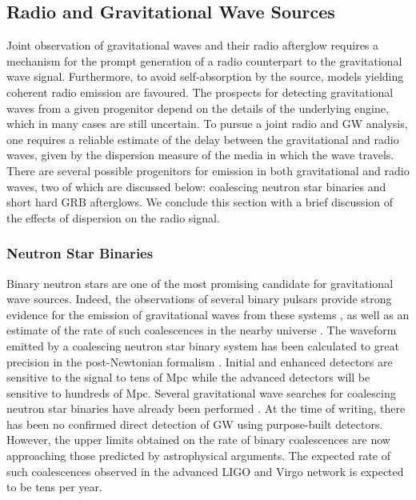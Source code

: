 \subsection{Radio and Gravitational Wave Sources} 
\label{sec:sources}

Joint observation of gravitational waves and their radio afterglow
requires a mechanism for the prompt generation of a radio counterpart to
the gravitational wave signal. Furthermore, to avoid self-absorption by
the source, models yielding coherent radio emission are favoured.  The
prospects for detecting gravitational waves from a given progenitor
depend on the details of the underlying engine, which in many cases are
still uncertain.  To pursue a joint radio and GW analysis, one requires
a reliable estimate of the delay between the gravitational and radio
waves, given by the dispersion measure of the media in which the wave
travels.  There are several possible progenitors for emission in both
gravitational and radio waves, two of which are discussed below:
coalescing neutron star binaries and short hard GRB afterglows.  We
conclude this section with a brief discussion of the effects of
dispersion on the radio signal. 

\subsubsection{Neutron Star Binaries}

Binary neutron stars are one of the most promising candidate for gravitational wave sources.  Indeed, the observations of several binary pulsars provide strong evidence for the emission of gravitational waves from these systems \cite{weisberg:2004}, as well as an estimate of the rate of such coalescences in the nearby universe \cite{Nutzman:2004bw}. The waveform emitted by a coalescing neutron star binary system has been calculated to great precision in the post-Newtonian formalism \cite{Blanchet:2002av}.  Initial and enhanced detectors are sensitive to the signal to tens of Mpc while the advanced detectors will be sensitive to hundreds of Mpc.  Several gravitational wave searches for coalescing neutron star binaries have already been performed \cite{Collaboration:2009tt, Abbott:2009qj}. At the time of writing, there has been no confirmed direct detection of GW using purpose-built detectors.  However, the  upper limits obtained on the rate of binary coalescences are now approaching  those predicted by astrophysical arguments.  The expected rate of such coalescences observed in the advanced LIGO and Virgo network is expected to be tens per year.

